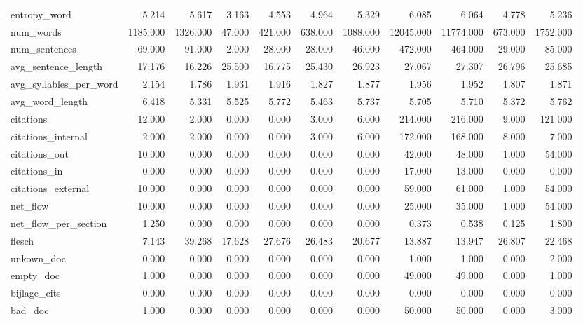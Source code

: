 \begin{tabular}{lrrrrrrrrrr}
\cline{1-11}
entropy\_word & 5.214 & 5.617 & 3.163 & 4.553 & 4.964 & 5.329 & 6.085 & 6.064 & 4.778 & 5.236 \\
\cline{1-11}
num\_words & 1185.000 & 1326.000 & 47.000 & 421.000 & 638.000 & 1088.000 & 12045.000 & 11774.000 & 673.000 & 1752.000 \\
\cline{1-11}
num\_sentences & 69.000 & 91.000 & 2.000 & 28.000 & 28.000 & 46.000 & 472.000 & 464.000 & 29.000 & 85.000 \\
\cline{1-11}
avg\_sentence\_length & 17.176 & 16.226 & 25.500 & 16.775 & 25.430 & 26.923 & 27.067 & 27.307 & 26.796 & 25.685 \\
\cline{1-11}
avg\_syllables\_per\_word & 2.154 & 1.786 & 1.931 & 1.916 & 1.827 & 1.877 & 1.956 & 1.952 & 1.807 & 1.871 \\
\cline{1-11}
avg\_word\_length & 6.418 & 5.331 & 5.525 & 5.772 & 5.463 & 5.737 & 5.705 & 5.710 & 5.372 & 5.762 \\
\cline{1-11}
citations & 12.000 & 2.000 & 0.000 & 0.000 & 3.000 & 6.000 & 214.000 & 216.000 & 9.000 & 121.000 \\
\cline{1-11}
citations\_internal & 2.000 & 2.000 & 0.000 & 0.000 & 3.000 & 6.000 & 172.000 & 168.000 & 8.000 & 7.000 \\
\cline{1-11}
citations\_out & 10.000 & 0.000 & 0.000 & 0.000 & 0.000 & 0.000 & 42.000 & 48.000 & 1.000 & 54.000 \\
\cline{1-11}
citations\_in & 0.000 & 0.000 & 0.000 & 0.000 & 0.000 & 0.000 & 17.000 & 13.000 & 0.000 & 0.000 \\
\cline{1-11}
citations\_external & 10.000 & 0.000 & 0.000 & 0.000 & 0.000 & 0.000 & 59.000 & 61.000 & 1.000 & 54.000 \\
\cline{1-11}
net\_flow & 10.000 & 0.000 & 0.000 & 0.000 & 0.000 & 0.000 & 25.000 & 35.000 & 1.000 & 54.000 \\
\cline{1-11}
net\_flow\_per\_section & 1.250 & 0.000 & 0.000 & 0.000 & 0.000 & 0.000 & 0.373 & 0.538 & 0.125 & 1.800 \\
\cline{1-11}
flesch & 7.143 & 39.268 & 17.628 & 27.676 & 26.483 & 20.677 & 13.887 & 13.947 & 26.807 & 22.468 \\
\cline{1-11}
unkown\_doc & 0.000 & 0.000 & 0.000 & 0.000 & 0.000 & 0.000 & 1.000 & 1.000 & 0.000 & 2.000 \\
\cline{1-11}
empty\_doc & 1.000 & 0.000 & 0.000 & 0.000 & 0.000 & 0.000 & 49.000 & 49.000 & 0.000 & 1.000 \\
\cline{1-11}
bijlage\_cits & 0.000 & 0.000 & 0.000 & 0.000 & 0.000 & 0.000 & 0.000 & 0.000 & 0.000 & 0.000 \\
\cline{1-11}
bad\_doc & 1.000 & 0.000 & 0.000 & 0.000 & 0.000 & 0.000 & 50.000 & 50.000 & 0.000 & 3.000 \\
\cline{1-11}
\bottomrule
\end{tabular}
